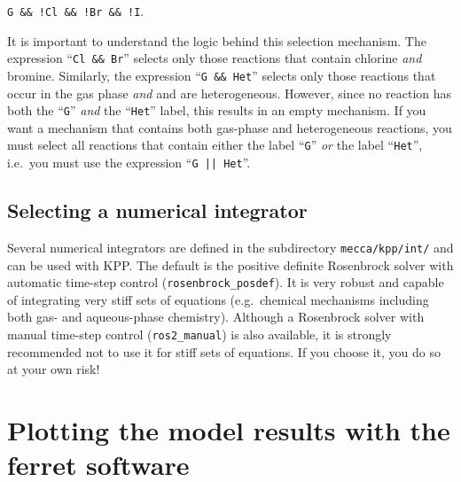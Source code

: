 \documentclass[twoside]{article}
\begin{document}
\verb|G && !Cl && !Br && !I|.

It is important to understand the logic behind this selection mechanism.
The expression ``\verb|Cl && Br|'' selects only those reactions that
contain chlorine {\em and} bromine. Similarly, the expression
``\verb|G && Het|'' selects only those reactions that occur in the gas
phase {\em and} and are heterogeneous. However, since no reaction has
both the ``\verb|G|'' {\em and} the ``\verb|Het|'' label, this results
in an empty mechanism. If you want a mechanism that contains both
gas-phase and heterogeneous reactions, you must select all reactions
that contain either the label ``\verb|G|'' {\em or} the label
``\verb|Het|'', i.e.\ you must use the expression ``\verb!G || Het!''.

\subsection{Selecting a numerical integrator}
\label{sec:selectintegrator}

Several numerical integrators are defined in the subdirectory
\verb|mecca/kpp/int/| and can be used with KPP. The default is the
positive definite Rosenbrock solver with automatic time-step control
(\verb|rosenbrock_posdef|). It is very robust and capable of integrating
very stiff sets of equations (e.g.\ chemical mechanisms including both
gas- and aqueous-phase chemistry). Although a Rosenbrock solver with
manual time-step control (\verb|ros2_manual|) is also available, it is
strongly recommended not to use it for stiff sets of equations. If you
choose it, you do so at your own risk!

\section{Plotting the model results with the ferret software}
\label{sec:ferret}
\end{document}
